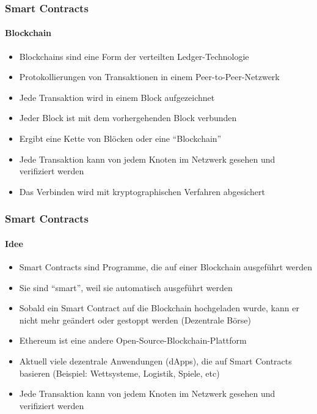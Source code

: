 \begin{frame}
  \frametitle{Smart Contracts}
  \framesubtitle{Blockchain}
  \begin{itemize}
    \item Blockchains sind eine Form der verteilten Ledger-Technologie
    \item Protokollierungen von Transaktionen in einem Peer-to-Peer-Netzwerk
    \item Jede Transaktion wird in einem Block aufgezeichnet
    \item Jeder Block ist mit dem vorhergehenden Block verbunden
    \item Ergibt eine Kette von Blöcken oder eine \enquote{Blockchain}
    \item Jede Transaktion kann von jedem Knoten im Netzwerk gesehen und verifiziert werden
    \item Das Verbinden wird mit kryptographischen Verfahren abgesichert
  \end{itemize}
\end{frame}

\begin{frame}
  \frametitle{Smart Contracts}
  \framesubtitle{Idee}
  \begin{itemize}
    \item Smart Contracts sind Programme, die auf einer Blockchain ausgeführt werden
    \item Sie sind \enquote{smart}, weil sie automatisch ausgeführt werden
    \item Sobald ein Smart Contract auf die Blockchain hochgeladen wurde, kann er nicht mehr geändert oder gestoppt werden (Dezentrale Börse)
    \item Ethereum ist eine andere Open-Source-Blockchain-Plattform 
    \item  Aktuell viele dezentrale Anwendungen (dApps), die auf Smart Contracts basieren (Beispiel: Wettsysteme, Logistik, Spiele, etc)
    \item Jede Transaktion kann von jedem Knoten im Netzwerk gesehen und verifiziert werden
  \end{itemize}
\end{frame}
